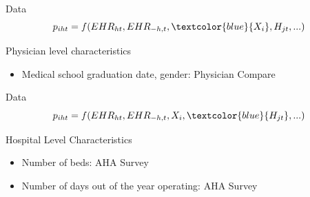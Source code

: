 \documentclass[10pt]{beamer}
\begin{document}
\begin{frame}[noframenumbering]{Data}
\begin{equation*}
    p_{iht}=f(EHR_{ht},EHR_{-h,t},\textcolor{blue}{X_i},H_{jt},...)
\end{equation*}

\vspace{5mm}

Physician level characteristics
\begin{itemize}
    \item Medical school graduation date, gender: Physician Compare
\end{itemize}
\end{frame}

\begin{frame}[noframenumbering]{Data}
\begin{equation*}
    p_{iht}=f(EHR_{ht},EHR_{-h,t},X_i,\textcolor{blue}{H_{jt}},...)
\end{equation*}

\vspace{5mm}

Hospital Level Characteristics
\begin{itemize}
    \item Number of beds: AHA Survey
    \item Number of days out of the year operating: AHA Survey
\end{itemize}
\end{frame}
\end{document}

